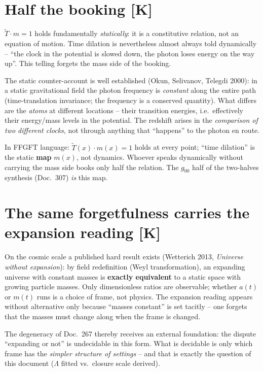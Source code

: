 \documentclass[11pt]{report}
\begin{document}
\section{Half the booking [K]}

$\tilde T \cdot m = 1$ holds fundamentally \emph{statically}: it is
a constitutive relation, not an equation of motion. Time dilation
is nevertheless almost always told dynamically -- \enquote{the
clock in the potential is slowed down, the photon loses energy on
the way up}. This telling forgets the mass side of the booking.

The static counter-account is well established (Okun, Selivanov,
Telegdi 2000): in a static gravitational field the photon frequency
is \emph{constant} along the entire path (time-translation
invariance; the frequency is a conserved quantity). What differs
are the \emph{atoms} at different locations -- their transition
energies, i.e.\ effectively their energy/mass levels in the
potential. The redshift arises in the \emph{comparison of two
different clocks}, not through anything that \enquote{happens} to
the photon en route.

In FFGFT language: $\tilde T(x)\cdot m(x) = 1$ holds at every
point; \enquote{time dilation} is the static \textbf{map} $m(x)$,
not dynamics. Whoever speaks dynamically without carrying the mass
side books only half the relation. The $g_{00}$ half of the
two-halves synthesis (Doc.~307) \emph{is} this map.

\section{The same forgetfulness carries the expansion reading [K]}

On the cosmic scale a published hard result exists (Wetterich 2013,
\emph{Universe without expansion}): by field redefinition (Weyl
transformation), an expanding universe with constant masses is
\textbf{exactly equivalent} to a static space with growing particle
masses. Only dimensionless ratios are observable; whether $a(t)$ or
$m(t)$ runs is a choice of frame, not physics. The expansion
reading appears without alternative only because \enquote{masses
constant} is set tacitly -- one forgets that the masses must change
along when the frame is changed.

The degeneracy of Doc.~267 thereby receives an external foundation:
the dispute \enquote{expanding or not} is undecidable in this form.
What is decidable is only which frame has the \emph{simpler
structure of settings} -- and that is exactly the question of this
document ($\Lambda$ fitted vs.\ closure scale derived).
\end{document}
